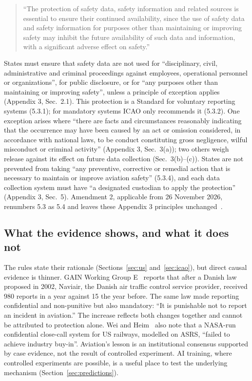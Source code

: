 \documentclass[11pt]{article}
\begin{document}
\begin{quote}
``The protection of safety data, safety information and related sources is essential to ensure their continued availability, since the use of safety data and safety information for purposes other than maintaining or improving safety may inhibit the future availability of such data and information, with a significant adverse effect on safety.'' \cite[Appendix~3, Note~1]{icao2016}
\end{quote}

States must ensure that safety data are not used for ``disciplinary, civil, administrative and criminal proceedings against employees, operational personnel or organizations'', for public disclosure, or for ``any purposes other than maintaining or improving safety'', unless a principle of exception applies (Appendix 3, Sec.~2.1). This protection is a Standard for voluntary reporting systems (5.3.1); for mandatory systems ICAO only recommends it (5.3.2). One exception arises where ``there are facts and circumstances reasonably indicating that the occurrence may have been caused by an act or omission considered, in accordance with national laws, to be conduct constituting gross negligence, wilful misconduct or criminal activity'' (Appendix 3, Sec.~3(a)); two others weigh release against its effect on future data collection (Sec.~3(b)--(c)). States are not prevented from taking ``any preventive, corrective or remedial action that is necessary to maintain or improve aviation safety'' (5.3.4), and each data collection system must have ``a designated custodian to apply the protection'' (Appendix 3, Sec.~5). Amendment 2, applicable from 26 November 2026, renumbers 5.3 as 5.4 and leaves these Appendix 3 principles unchanged~\cite{icao2025}.

\subsection{What the evidence shows, and what it does not}\label{sec:evidence}

The rules state their rationale (Sections~\ref{sec:us} and~\ref{sec:icao}), but direct causal evidence is thinner. GAIN Working Group E~\cite[Sec.~4.1]{gain2004} reports that after a Danish law proposed in 2002, Naviair, the Danish air traffic control service provider, received 980 reports in a year against 15 the year before. The same law made reporting confidential and non-punitive but also mandatory: ``It is punishable not to report an incident in aviation.'' The increase reflects both changes together and cannot be attributed to protection alone. Wei and Heim~\cite{weiheim2026} also note that a NASA-run confidential close-call system for US railways, modelled on ASRS, ``failed to achieve industry buy-in''. Aviation's lesson is an institutional consensus supported by case evidence, not the result of controlled experiment. AI training, where controlled experiments are possible, is a useful place to test the underlying mechanism (Section~\ref{sec:predictions}).
\end{document}

